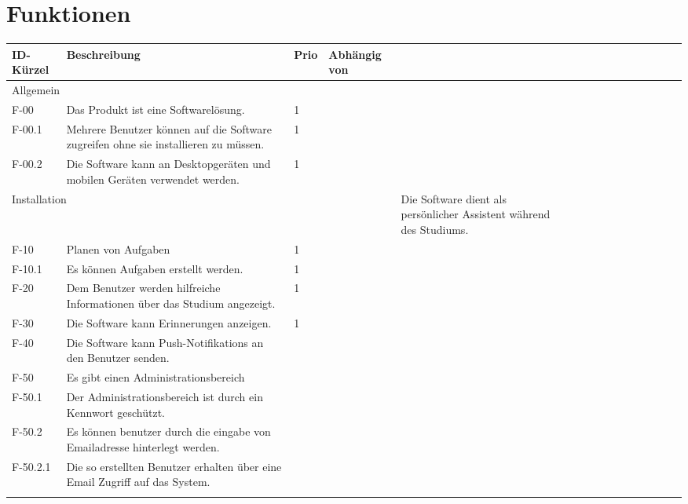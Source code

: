 \chapter{Funktionen}



\begin{table}[H]
    \label{Funktionen::main}
    \begin{tabularx}{\textwidth}{|l|X|l|l|}
        \toprule
        \textbf{ID-Kürzel} & \textbf{Beschreibung} & \textbf{Prio} & \textbf{Abhängig von} \\
        \endhead
        \hline
        \multicolumn{4}{|l|}{Allgemein}\\
        \hline
        F-00 & Das Produkt ist eine Softwarelösung. & 1 & \\
        F-00.1 & Mehrere Benutzer können auf die Software zugreifen ohne sie installieren zu müssen. & 1 & \\
        F-00.2 & Die Software kann an Desktopgeräten und mobilen Geräten verwendet werden. & 1 & \\
        \hline
        \multicolumn{4}{|l|}{Installation}
        \multicolumn{4}{|l|}{Installation und Administration}
        \multicolumn{4}{|l|}{}
        \multicolumn{4}{|l|}{Erinnerungen}
        \multicolumn{4}{|l|}{
        F-10 & Die Software dient als persönlicher Assistent während des Studiums. & & \\
        F-10 & Planen von Aufgaben & 1 & \\
        F-10.1 & Es können Aufgaben erstellt werden. & 1 & \\

        F-20 & Dem Benutzer werden hilfreiche Informationen über das Studium angezeigt. & 1 & \\

        F-30 & Die Software kann Erinnerungen anzeigen. & 1 & \\

        F-40 & Die Software kann Push-Notifikations an den Benutzer senden. & & \\

        F-50 & Es gibt einen Administrationsbereich & & \\
        F-50.1 & Der Administrationsbereich ist durch ein Kennwort geschützt. & & \\ %
        F-50.2 & Es können benutzer durch die eingabe von Emailadresse hinterlegt werden. & & \\
        F-50.2.1 & Die so erstellten Benutzer erhalten über eine Email Zugriff auf das System. & & \\ %
        
}
\end{tabularx}
\end{table}
